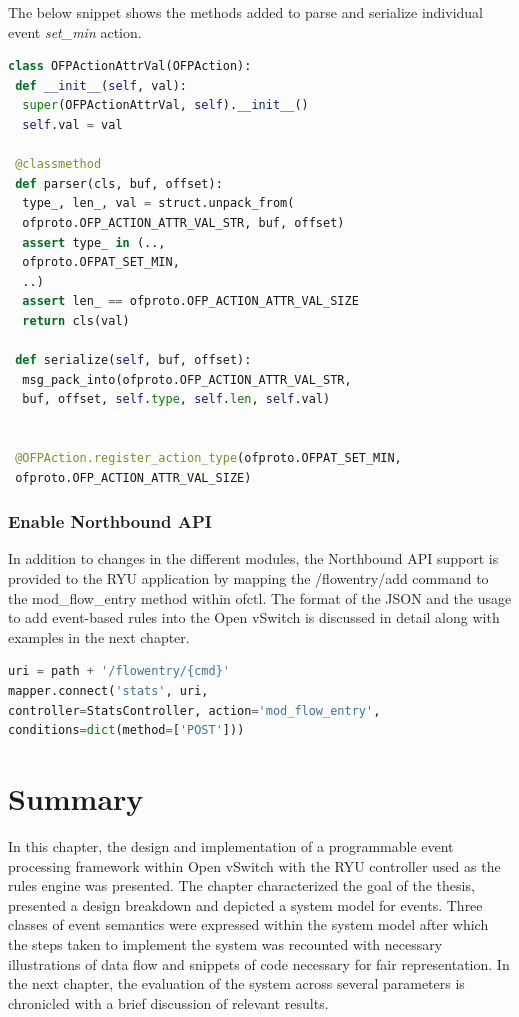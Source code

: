 \begin{itemize}
  The below snippet shows the methods added to parse and serialize individual event \textit{set_min} action. \newline 
  
 \begin{lstlisting}[language=python]
 class OFPActionAttrVal(OFPAction):
 def __init__(self, val):
  super(OFPActionAttrVal, self).__init__()
  self.val = val

 @classmethod
 def parser(cls, buf, offset):
  type_, len_, val = struct.unpack_from(
  ofproto.OFP_ACTION_ATTR_VAL_STR, buf, offset)
  assert type_ in (..,
  ofproto.OFPAT_SET_MIN,
  ..)
  assert len_ == ofproto.OFP_ACTION_ATTR_VAL_SIZE
  return cls(val)
 
 def serialize(self, buf, offset):
  msg_pack_into(ofproto.OFP_ACTION_ATTR_VAL_STR,
  buf, offset, self.type, self.len, self.val) 
 
 
 @OFPAction.register_action_type(ofproto.OFPAT_SET_MIN,
 ofproto.OFP_ACTION_ATTR_VAL_SIZE) 
 \end{lstlisting} 

\end{itemize}

\subsubsection{Enable Northbound API}
In addition to changes in the different modules, the Northbound API support is provided to the RYU application by mapping the /flowentry/add command to the mod_flow_entry method within ofctl. The format of the JSON and the usage to add event-based rules into the Open vSwitch is discussed in detail along with examples in the next chapter. \newline


\begin{lstlisting}[language=python]
uri = path + '/flowentry/{cmd}'
mapper.connect('stats', uri,
controller=StatsController, action='mod_flow_entry',
conditions=dict(method=['POST']))
\end{lstlisting}


\section{Summary}
In this chapter, the design and implementation of a programmable event processing framework within Open vSwitch with the RYU controller used as the rules engine was presented. The chapter characterized the goal of the thesis, presented a design breakdown and depicted a system model for events. Three classes of event semantics were expressed within the system model after which the steps taken to implement the system was recounted with necessary illustrations of data flow and snippets of code necessary for fair representation. In the next chapter, the evaluation of the system across several parameters is chronicled with a brief discussion of relevant results.

